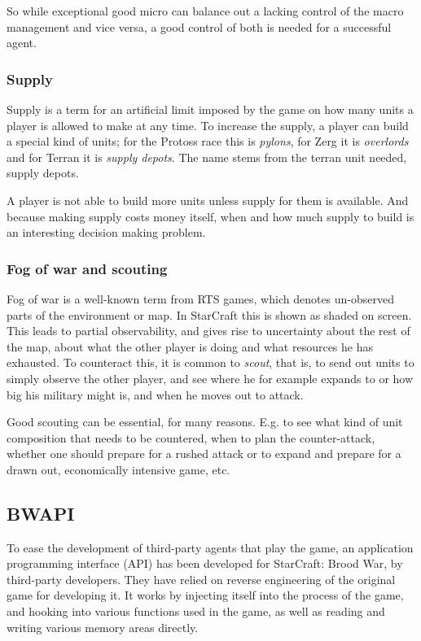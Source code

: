 So while exceptional good micro can balance out a lacking control of the macro management and vice versa, a good control of both is needed for a successful agent.

\subsubsection{Supply}
Supply is a term for an artificial limit imposed by the game on how many units a player is allowed to make at any time. To increase the supply, a player can build a special kind of units; for the Protoss race this is {\em pylons}, for Zerg it is {\em overlords} and for Terran it is {\em supply depots}. The name stems from the terran unit needed, supply depots.

A player is not able to build more units unless supply for them is available. And because making supply costs money itself, when and how much supply to build is an interesting decision making problem.

\subsubsection{Fog of war and scouting}
Fog of war is a well-known term from RTS games, which denotes un-observed parts of the environment or map. In StarCraft this is shown as shaded on screen. This leads to partial observability, and gives rise to uncertainty about the rest of the map, about what the other player is doing and what resources he has exhausted. To counteract this, it is common to {\em scout}, that is, to send out units to simply observe the other player, and see where he for example expands to or how big his military might is, and when he moves out to attack.

Good scouting can be essential, for many reasons. E.g. to see what kind of unit composition that needs to be countered, when to plan the counter-attack, whether one should prepare for a rushed attack or to expand and prepare for a drawn out, economically intensive game, etc.

\subsection{BWAPI}
To ease the development of third-party agents that play the game, an application programming interface (API) has been developed for StarCraft: Brood War, by third-party developers. They have relied on reverse engineering of the original game for developing it. It works by injecting itself into the process of the game, and hooking into various functions used in the game, as well as reading and writing various memory areas directly.\cite{bwapi}

